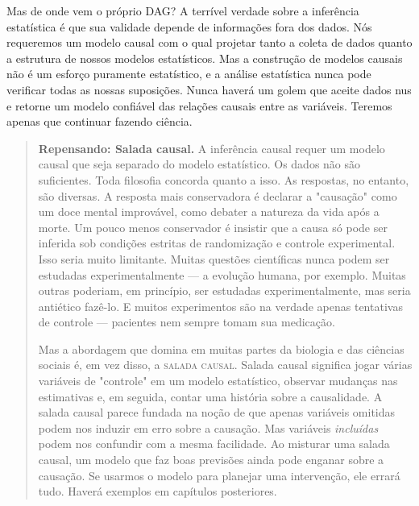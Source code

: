 Mas de onde vem o próprio DAG? A terrível verdade sobre a inferência estatística é que sua validade depende de informações fora dos dados. Nós requeremos um modelo causal com o qual projetar tanto a coleta de dados quanto a estrutura de nossos modelos estatísticos. Mas a construção de modelos causais não é um esforço puramente estatístico, e a análise estatística nunca pode verificar todas as nossas suposições. Nunca haverá um golem que aceite dados nus e retorne um modelo confiável das relações causais entre as variáveis. Teremos apenas que continuar fazendo ciência.

\begin{quote}
  \textbf{Repensando: Salada causal.} A inferência causal requer um modelo causal que seja separado do modelo estatístico. Os dados não são suficientes. Toda filosofia concorda quanto a isso. As respostas, no entanto, são diversas. A resposta mais conservadora é declarar a "causação" como um doce mental improvável, como debater a natureza da vida após a morte. Um pouco menos conservador é insistir que a causa só pode ser inferida sob condições estritas de randomização e controle experimental. Isso seria muito limitante. Muitas questões científicas nunca podem ser estudadas experimentalmente — a evolução humana, por exemplo. Muitas outras poderiam, em princípio, ser estudadas experimentalmente, mas seria antiético fazê-lo. E muitos experimentos são na verdade apenas tentativas de controle — pacientes nem sempre tomam sua medicação.

  Mas a abordagem que domina em muitas partes da biologia e das ciências sociais é, em vez disso, a \textsc{salada causal}. Salada causal significa jogar várias variáveis de "controle" em um modelo estatístico, observar mudanças nas estimativas e, em seguida, contar uma história sobre a causalidade. A salada causal parece fundada na noção de que apenas variáveis omitidas podem nos induzir em erro sobre a causação. Mas variáveis \textit{incluídas} podem nos confundir com a mesma facilidade. Ao misturar uma salada causal, um modelo que faz boas previsões ainda pode enganar sobre a causação. Se usarmos o modelo para planejar uma intervenção, ele errará tudo. Haverá exemplos em capítulos posteriores.
\end{quote}
